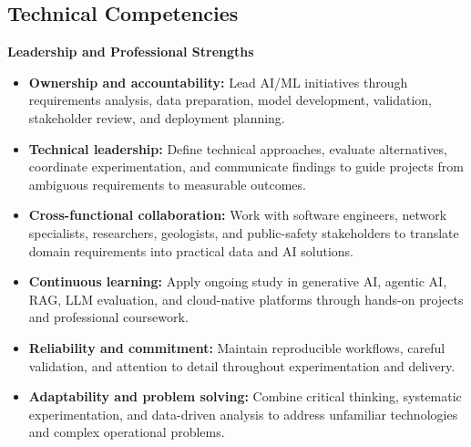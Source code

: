 \documentclass[9pt,letterpaper]{extarticle}
\begin{document}
\subsection{Technical Competencies}
\par
{}\par
{}\par
{}\par
{}\par
{}\par
{}\textbf{Leadership and Professional Strengths}\par
\begin{itemize}
\item \textbf{Ownership and accountability:} Lead AI/ML initiatives through requirements analysis, data preparation, model development, validation, stakeholder review, and deployment planning.
\item \textbf{Technical leadership:} Define technical approaches, evaluate alternatives, coordinate experimentation, and communicate findings to guide projects from ambiguous requirements to measurable outcomes.
\item \textbf{Cross-functional collaboration:} Work with software engineers, network specialists, researchers, geologists, and public-safety stakeholders to translate domain requirements into practical data and AI solutions.
\item \textbf{Continuous learning:} Apply ongoing study in generative AI, agentic AI, RAG, LLM evaluation, and cloud-native platforms through hands-on projects and professional coursework.
\item \textbf{Reliability and commitment:} Maintain reproducible workflows, careful validation, and attention to detail throughout experimentation and delivery.
\item \textbf{Adaptability and problem solving:} Combine critical thinking, systematic experimentation, and data-driven analysis to address unfamiliar technologies and complex operational problems.
\end{itemize}
\end{document}
